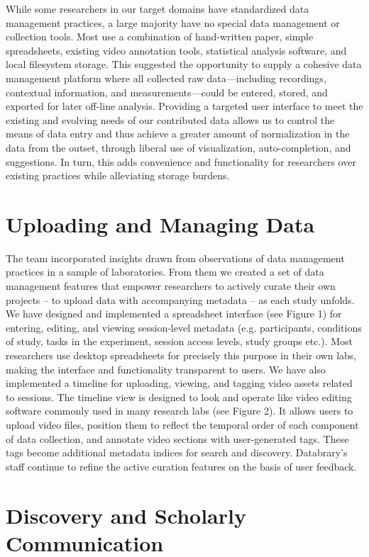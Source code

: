 \documentclass{sig-alternate}
\begin{document}
While some researchers in our target domains have standardized data management practices, a large majority have no special data management or collection tools.
Most use a combination of hand-written paper, simple spreadsheets, existing video annotation tools, statistical analysis software, and local filesystem storage.
This suggested the opportunity to supply a cohesive data management platform where all collected raw data---including recordings, contextual information, and measurements---could be entered, stored, and exported for later off-line analysis.
Providing a targeted user interface to meet the existing and evolving needs of our contributed data allows us to control the means of data entry and thus achieve a greater amount of normalization in the data from the outset, through liberal use of visualization, auto-completion, and suggestions.
In turn, this adds convenience and functionality for researchers over existing practices while alleviating storage burdens.


\section{Uploading and Managing Data}

The team incorporated insights drawn from observations of data management practices in a sample of laboratories. 
From them we created a set of data management features that empower researchers to actively curate their own projects – to upload data with accompanying metadata – as each study unfolds. 
We have designed and implemented a spreadsheet interface (see Figure 1) for entering, editing, and viewing session-level metadata (e.g. participants, conditions of study, tasks in the experiment, session access levels, study groups etc.). 
Most researchers use desktop spreadsheets for precisely this purpose in their own labs, making the interface and functionality transparent to users.  We have also implemented a timeline for uploading, viewing, and tagging video assets related to sessions.  The timeline view is designed to look and operate like video editing software commonly used in many research labs (see Figure 2).
It allows users to upload video files, position them to reflect the temporal order of each component of data collection, and annotate video sections with user-generated tags. 
These tags become additional metadata indices for search and discovery. 
Databrary’s staff continue to refine the active curation features on the basis of user feedback.

\section{Discovery and Scholarly Communication}
\end{document}
